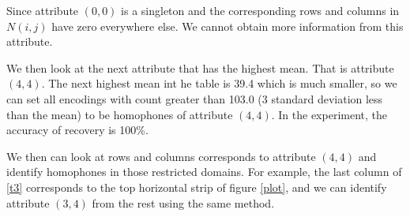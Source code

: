 \documentclass{article}
\begin{document}
Since attribute $(0,0)$ is a singleton and the corresponding rows and columns in $N(i,j)$ have zero everywhere else. We cannot obtain more information from this attribute.

We then look at the next attribute that has the highest mean. That is attribute $(4,4)$. The next highest mean int he table is 39.4 which is much smaller, so we can set all encodings with count greater than 103.0 (3 standard deviation less than the mean) to be homophones of attribute $(4,4)$. In the experiment, the accuracy of recovery is 100\%.

We then can look at rows and columns corresponds to attribute $(4,4)$ and identify homophones in those restricted domains. For example, the last column of \ref{t3} corresponds to the top horizontal strip of figure \ref{plot}, and we can identify attribute $(3,4)$ from the rest using the same method.
\end{document}
